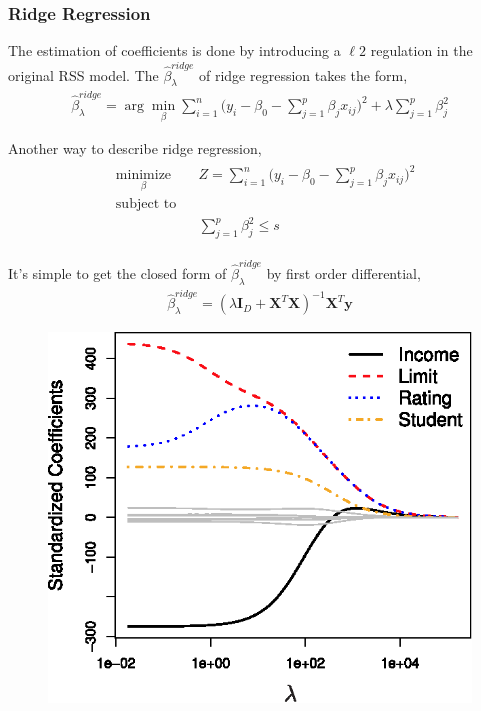 \documentclass[12pt,a4paper]{article}%
\theoremstyle{definition}
\theoremstyle{plain}
\numberwithin{equation}{section}
\begin{document}
\subsubsection{\textbf{Ridge Regression}}
The estimation of coefficients is done by introducing a $\ell 2$ regulation in the original RSS model. The $\hat{\beta}^{ridge}_{\lambda}$ of ridge regression takes the form, 
\begin{gather}
\hat{\beta}^{ridge}_{\lambda} = \arg\min_{\beta} \sum\limits_{i=1}^{n} \bigg( y_{i}-\beta_{0}- \sum\limits_{j=1}^{p}\beta_{j}x_{ij} \bigg)^{2} + \lambda \sum\limits_{j=1}^{p}\beta_{j}^{2}
\label{ridgeFormula}
\end{gather}

Another way to describe ridge regression,
\begin{equation}
\begin{aligned}
\begin{split}
& \underset{\beta}{\text{minimize}} & & Z = \sum\limits_{i=1}^{n} \bigg( y_{i}-\beta_{0}- \sum\limits_{j=1}^{p}\beta_{j}x_{ij} \bigg)^{2} \\
& \text{subject to} 				& & \\
& & & \sum\limits_{j=1}^{p}\beta_{j}^{2} \leq s
\end{split}
\end{aligned}
\label{lasso}
\end{equation}

It's simple to get the closed form of $\hat{\beta}^{ridge}_{\lambda}$ by first order differential,
\begin{gather*}
\hat{\beta}^{ridge}_{\lambda} = (\lambda \mathbf{I}_{D} + \mathbf{X}^{T} \mathbf{X})^{-1} \mathbf{X}^{T} \mathbf{y}
\end{gather*}

\begin{figure}[H]
\centering
\includegraphics[scale=1]{images//6_4.eps}
\\~\\
\caption{ }\label{ridgeRegression}
\end{figure}
\end{document}
